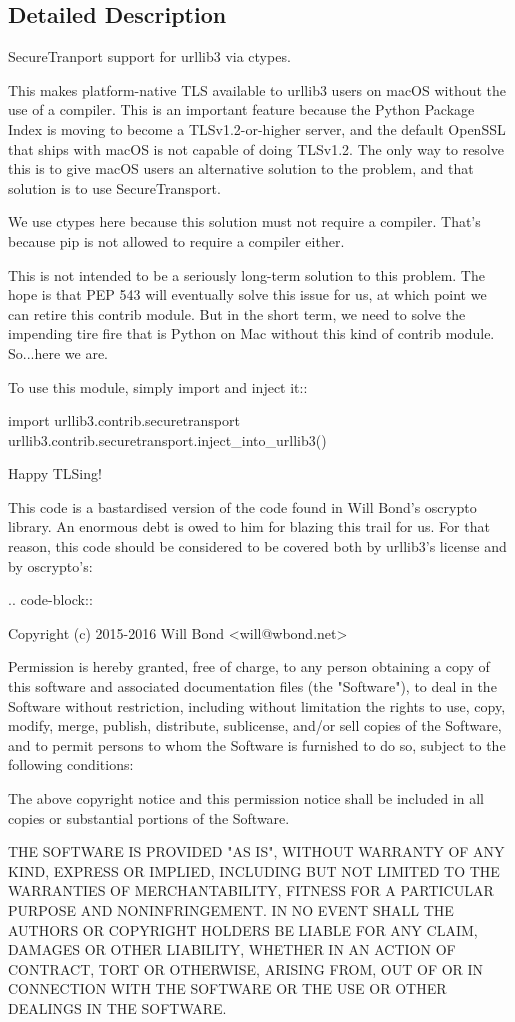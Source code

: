 \subsection{Detailed Description}
\begin{DoxyVerb}SecureTranport support for urllib3 via ctypes.

This makes platform-native TLS available to urllib3 users on macOS without the
use of a compiler. This is an important feature because the Python Package
Index is moving to become a TLSv1.2-or-higher server, and the default OpenSSL
that ships with macOS is not capable of doing TLSv1.2. The only way to resolve
this is to give macOS users an alternative solution to the problem, and that
solution is to use SecureTransport.

We use ctypes here because this solution must not require a compiler. That's
because pip is not allowed to require a compiler either.

This is not intended to be a seriously long-term solution to this problem.
The hope is that PEP 543 will eventually solve this issue for us, at which
point we can retire this contrib module. But in the short term, we need to
solve the impending tire fire that is Python on Mac without this kind of
contrib module. So...here we are.

To use this module, simply import and inject it::

    import urllib3.contrib.securetransport
    urllib3.contrib.securetransport.inject_into_urllib3()

Happy TLSing!

This code is a bastardised version of the code found in Will Bond's oscrypto
library. An enormous debt is owed to him for blazing this trail for us. For
that reason, this code should be considered to be covered both by urllib3's
license and by oscrypto's:

.. code-block::

    Copyright (c) 2015-2016 Will Bond <will@wbond.net>

    Permission is hereby granted, free of charge, to any person obtaining a
    copy of this software and associated documentation files (the "Software"),
    to deal in the Software without restriction, including without limitation
    the rights to use, copy, modify, merge, publish, distribute, sublicense,
    and/or sell copies of the Software, and to permit persons to whom the
    Software is furnished to do so, subject to the following conditions:

    The above copyright notice and this permission notice shall be included in
    all copies or substantial portions of the Software.

    THE SOFTWARE IS PROVIDED "AS IS", WITHOUT WARRANTY OF ANY KIND, EXPRESS OR
    IMPLIED, INCLUDING BUT NOT LIMITED TO THE WARRANTIES OF MERCHANTABILITY,
    FITNESS FOR A PARTICULAR PURPOSE AND NONINFRINGEMENT. IN NO EVENT SHALL THE
    AUTHORS OR COPYRIGHT HOLDERS BE LIABLE FOR ANY CLAIM, DAMAGES OR OTHER
    LIABILITY, WHETHER IN AN ACTION OF CONTRACT, TORT OR OTHERWISE, ARISING
    FROM, OUT OF OR IN CONNECTION WITH THE SOFTWARE OR THE USE OR OTHER
    DEALINGS IN THE SOFTWARE.
\end{DoxyVerb}
 

